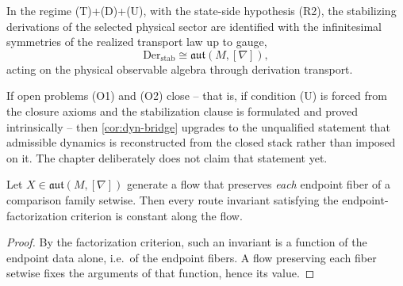 \begin{corollary}
	\label{cor:dyn-bridge}
	In the regime \textup{(T)}+\textup{(D)}+\textup{(U)}, with the
	state-side hypothesis \textup{(R2)}, the stabilizing derivations
	of the selected physical sector are identified with the
	infinitesimal symmetries of the realized transport law up to
	gauge,
	\[
		\mathrm{Der}_{\mathrm{stab}}\cong\mathfrak{aut}(M,[\nabla]),
	\]
	acting on the physical observable algebra through derivation
	transport.
\end{corollary}

\begin{remark}
	\label{rem:dyn-upgrade}
	If open problems \textup{(O1)} and \textup{(O2)} close -- that is,
	if condition \textup{(U)} is forced from the closure axioms and the
	stabilization clause is formulated and proved intrinsically -- then
	\cref{cor:dyn-bridge} upgrades to the unqualified statement that
	admissible dynamics is reconstructed from the closed stack rather
	than imposed on it. The chapter deliberately does not claim that
	statement yet.
\end{remark}

\begin{corollary}
	\label{cor:dyn-conservation}
	Let \(X\in\mathfrak{aut}(M,[\nabla])\) generate a flow that
	preserves \emph{each} endpoint fiber of a comparison family
	setwise. Then every route invariant satisfying the
	endpoint-factorization criterion is constant along the flow.
\end{corollary}
\begin{proof}
	By the factorization criterion, such an invariant is a function of
	the endpoint data alone, i.e.\ of the endpoint fibers. A flow
	preserving each fiber setwise fixes the arguments of that function,
	hence its value.
\end{proof}

